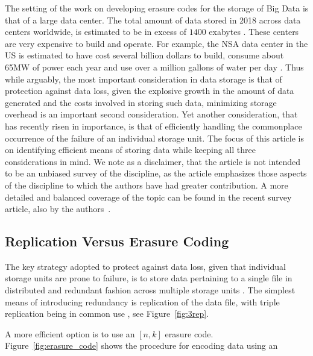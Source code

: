 \begin{multicols}{2}
The setting of the work on developing erasure codes for the storage of Big Data is that of a large data center.  The total amount of data stored in 2018 across data centers worldwide, is estimated to be in excess of $1400$ exabytes \cite{datacenterstorage}.   These centers are very expensive to build and operate.  For example, the NSA data center in the US is estimated to have cost several billion dollars to build, consume about 65MW of power each year and use over a million gallons of water per day \cite{utahestimate}.  Thus while arguably, the most important consideration in data storage is that of protection against data loss, given the explosive growth in the amount of data generated and the costs involved in storing such data, minimizing storage overhead is an important second consideration.  Yet another consideration, that has recently risen in importance, is that of efficiently handling the commonplace occurrence of the failure of an individual storage unit. The focus of this article is on identifying efficient means of storing data while keeping all three considerations in mind.  We note as a disclaimer, that the article is not intended to be an unbiased survey of the discipline, as the article emphasizes those aspects of the discipline to which the authors have had greater contribution. 	A more detailed and balanced coverage of the topic can be found in the recent survey article, also by the authors~\cite{ScienceChinaBalajiKVRSK18}. %
	
\subsection{Replication Versus Erasure Coding} 
	
The key strategy adopted to protect against data loss, given that individual storage units are prone to failure, is to store data pertaining to a single file in distributed and redundant fashion across multiple storage units \cite{ScienceChinaBalajiKVRSK18}.   The simplest means of introducing redundancy is replication of the data file, with triple replication being in common use \cite{hadoop}, see Figure~\ref{fig:3rep}.  

A more efficient option is to use an $[n,k]$ erasure code. Figure~\ref{fig:erasure_code} shows the procedure for encoding data using an
\end{multicols}

